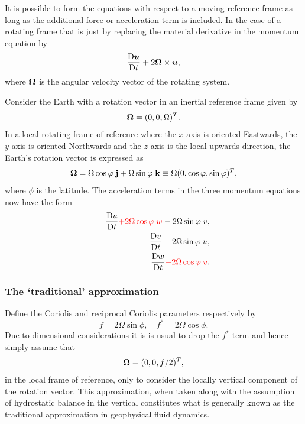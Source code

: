 It is possible to form the equations with respect to a moving reference frame as long as the
additional force or acceleration term is included. In the case of a rotating frame that is
just by replacing the material derivative in the momentum equation by
\begin{equation}
\frac{\mathrm{D}{\mbox{\boldmath$u$}}}{\mathrm{D} t} + 2{\mbox{\boldmath$\Omega$}}\times{\mbox{\boldmath$u$}},
\end{equation}
where ${\mbox{\boldmath$\Omega$}}$ is the angular velocity vector of the rotating
system.

Consider the Earth with a rotation vector in an inertial reference frame given by 
\begin{equation}\label{eq:on_sphere_rotation}
{\mbox{\boldmath$\Omega$}}=(0,0,\Omega)^T.
\end{equation}
In a local rotating frame of reference where the
$x$-axis is oriented Eastwards,
the $y$-axis is oriented Northwards and the $z$-axis is the local upwards direction,
the Earth's rotation vector is expressed as
\begin{equation*}
{\mbox{\boldmath$\Omega$}} = \Omega \cos \varphi\; {\bf j} + \Omega \sin \varphi\; {\bf k} \equiv \Omega (0,\cos\varphi,\sin\varphi)^T,
\end{equation*}
where $\phi$ is the latitude.
The acceleration terms in the three momentum equations now have the form
{\setlength\arraycolsep{2pt}
\begin{eqnarray*}
&&\frac{\mathrm{D} u}{\mathrm{D} t} {\color{red}+} {\color{red}2\Omega\cos\varphi\; w} - 2\Omega\sin\varphi\; v,\\
&&\frac{\mathrm{D} v}{\mathrm{D} t} + 2\Omega\sin\varphi\; u,\\
&&\frac{\mathrm{D} w}{\mathrm{D} t} {\color{red}-} {\color{red}2\Omega\cos\varphi\; v}.
\end{eqnarray*}}

\subsubsection{The `traditional' approximation}
Define the Coriolis and reciprocal Coriolis parameters \citep{cushman1994} respectively by
\begin{equation}\label{eq:coriolis_parameters} 
f=2\Omega\sin\phi,\quad f^*=2\Omega\cos\phi.
\end{equation}
Due to dimensional considerations it is is usual to
drop the $f^*$ term and hence simply assume that 
\begin{equation}\label{eq:f_omega}
{\mbox{\boldmath$\Omega$}}=(0,0,f/2)^T,
\end{equation}
in the local frame of reference, \ie only to consider the locally vertical
component of the rotation vector.
This approximation, when taken along with the assumption of hydrostatic balance in the
vertical constitutes what is generally known as the traditional approximation in geophysical fluid
dynamics.


